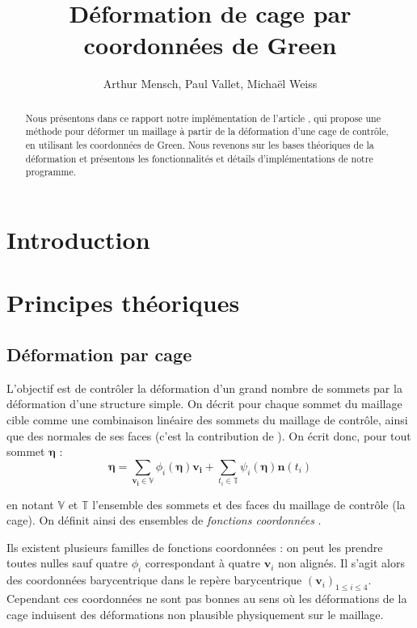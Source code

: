 \documentclass[10pt,a4paper]{article}
\author{Arthur Mensch, Paul Vallet, Michaël Weiss}
\title{Déformation de cage par coordonnées de Green}
\begin{document}
\maketitle
\begin{abstract}
Nous présentons dans ce rapport notre implémentation de l'article \cite{lipman2008green}, qui propose une méthode pour déformer un maillage à partir de la déformation d'une cage de contrôle, en utilisant les coordonnées de Green. Nous revenons sur les bases théoriques de la déformation et présentons les fonctionnalités et détails d'implémentations de notre programme.
\end{abstract}
\section*{Introduction}

\section{Principes théoriques}
\label{section:theory}

\subsection{Déformation par cage}

L'objectif est de contrôler la déformation d'un grand nombre de sommets par la déformation d'une structure simple. On décrit pour chaque sommet du maillage cible comme une combinaison linéaire des sommets du maillage de contrôle, ainsi que des normales de ses faces (c'est la contribution de \cite{lipman2008green}). On écrit donc, pour tout sommet $\mathbf{\eta}$ :
\begin{equation}
\label{eq:linear}
\mathbf{\eta} = \sum_{\mathbf{v_i} \in \mathbb{V}} \phi_i \left( \mathbf{\eta} \right) \mathbf{v_i} 
+ \sum_{t_i \in \mathbb{T}} \psi_i \left( \mathbf{\eta} \right) \mathbf{n} \left( t_i \right)
\end{equation}

en notant $\mathbb{V}$ et $\mathbb{T}$ l'ensemble des sommets et des faces du maillage de contrôle (la cage). On définit ainsi des ensembles de \textit{fonctions coordonnées} .

Ils existent plusieurs familles de fonctions coordonnées : on peut les prendre toutes nulles sauf quatre $\phi_i$ correspondant à quatre $\mathbf{v}_i$ non alignés. Il s'agit alors des coordonnées barycentrique dans le repère barycentrique $\left( \mathbf{v}_i \right)_{1 \leq i \leq 4}$. Cependant ces coordonnées ne sont pas bonnes au sens où les déformations de la cage induisent des déformations non plausible physiquement sur le maillage.
\end{document}

